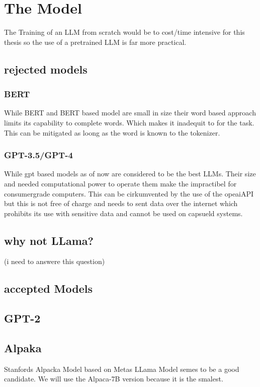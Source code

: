 \section{The Model}\raggedbottom
The Training of an LLM from scratch would be to cost/time intensive for this thesis so the use of a pretrained LLM is far more practical.


\subsection{rejected models}




\subsubsection{BERT}
While BERT and BERT based model are small in size their word based approach limits its capability to complete words. Which makes it inadequit to for the task. This can be mitigated as loong as the word is known to the tokenizer.

\subsubsection{GPT-3.5/GPT-4}
While gpt based models as of now are considered to be the best LLMs. Their size and needed computational power to operate them make the impractibel for consumergrade computers. This can be cirkumvented by the use of the opeaiAPI but this is not free of charge and needs to sent data over the internet which prohibits its use with sensitive data and cannot be used on capsueld systems. 

\subsection{why not LLama?} 
(i need to answere this question)


\subsection{accepted Models}

\subsection{GPT-2}

\subsection{Alpaka} 
Stanfords Alpacka Model based on Metas LLama Model semes to be a good candidate.
We will use the Alpaca-7B version because it is the smalest. 


